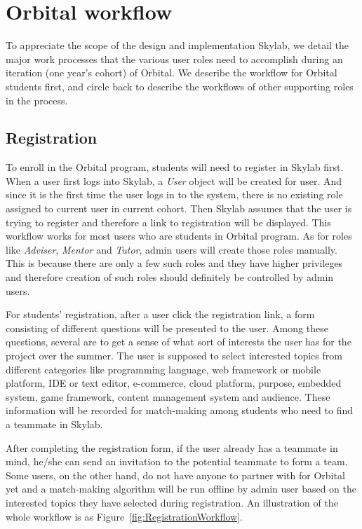 \chapter{Orbital workflow} \label{workflow}

To appreciate the scope of the design and implementation Skylab, we detail the major work processes that the various user roles need to accomplish during an iteration (one year's cohort) of Orbital.  We describe the workflow for Orbital students first, and circle back to describe the workflows of other supporting roles in the process.

\section{Registration} \label{registration}

To enroll in the Orbital program, students will need to register in Skylab first. When a user first logs into Skylab, a \textit{User} object will be created for user. And since it is the first time the user logs in to the system, there is no existing role assigned to current user in current cohort. Then Skylab assumes that the user is trying to register and therefore a link to registration will be displayed. This workflow works for most users who are students in Orbital program. As for roles like \textit{Adviser}, \textit{Mentor} and \textit{Tutor}, admin users will create those roles manually. This is because there are only a few such roles and they have higher privileges and therefore creation of such roles should definitely be controlled by admin users.

For students' registration, after a user click the registration link, a form consisting of different questions will be presented to the user. Among these questions, several are to get a sense of what sort of interests the user has for the project over the summer. The user is supposed to select interested topics from different categories like programming language, web framework or mobile platform, IDE or text editor, e-commerce, cloud platform, purpose, embedded system, game framework, content management system and audience. These information will be recorded for match-making among students who need to find a teammate in Skylab.

After completing the registration form, if the user already has a teammate in mind, he/she can send an invitation to the potential teammate to form a team. Some users, on the other hand, do not have anyone to partner with for Orbital yet and a match-making algorithm will be run offline by admin user based on the interested topics they have selected during registration. An illustration of the whole workflow is as Figure~\ref{fig:RegistrationWorkflow}.

